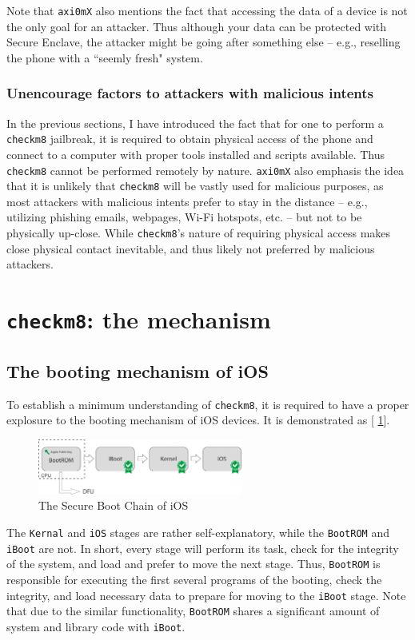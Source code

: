 \documentclass[10pt]{article}
\newcommand{\inlinecode}{\texttt}
\begin{document}
Note that \inlinecode{axi0mX} also mentions the fact that accessing the data of a device is not the only goal for an attacker. Thus although your data can be protected with Secure Enclave, the attacker might be going after something else -- e.g., reselling the phone with a ``seemly fresh" system.

\subsubsection{Unencourage factors to attackers with malicious intents}
In the previous sections, I have introduced the fact that for one to perform a \inlinecode{checkm8} jailbreak, it is required to obtain physical access of the phone and connect to a computer with proper tools installed and scripts available. Thus \inlinecode{checkm8} cannot be performed remotely by nature. \inlinecode{axi0mX} also emphasis the idea that it is unlikely that \inlinecode{checkm8} will be vastly used for malicious purposes, as most attackers with malicious intents prefer to stay in the distance -- e.g., utilizing phishing emails, webpages, Wi-Fi hotspots, etc. -- but not to be physically up-close. While \inlinecode{checkm8}'s nature of requiring physical access makes close physical contact inevitable, and thus likely not preferred by malicious attackers.

\section{\inlinecode{checkm8}: the mechanism}
\subsection{The booting mechanism of iOS}

To establish a minimum understanding of \inlinecode{checkm8}, it is required to have a proper explosure to the booting mechanism of iOS devices. It is demonstrated as [\figurename{ \ref{figure_1}}].
\begin{figure}[!ht]
    \centering
    \includegraphics[width = 0.6\textwidth]{figure_1}
    \caption{The Secure Boot Chain of iOS}
    \label{figure_1}
\end{figure}

The \inlinecode{Kernal} and \inlinecode{iOS} stages are rather self-explanatory, while the \inlinecode{BootROM} and \inlinecode{iBoot} are not. In short, every stage will perform its task, check for the integrity of the system, and load and prefer to move the next stage. Thus, \inlinecode{BootROM} is responsible for executing the first several programs of the booting, check the integrity, and load necessary data to prepare for moving to the \inlinecode{iBoot} stage. Note that due to the similar functionality, \inlinecode{BootROM} shares a significant amount of system and library code with \inlinecode{iBoot}.
\end{document}

